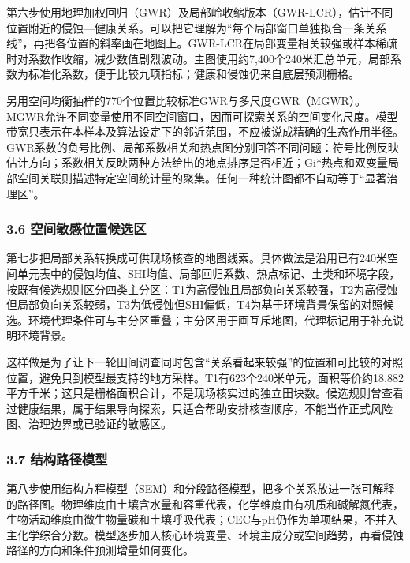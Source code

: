 \documentclass[
  10.5pt,
]{article}
\begin{document}
第六步使用地理加权回归（GWR）及局部岭收缩版本（GWR-LCR），估计不同位置附近的侵蚀---健康关系。可以把它理解为``每个局部窗口单独拟合一条关系线''，再把各位置的斜率画在地图上。GWR-LCR在局部变量相关较强或样本稀疏时对系数作收缩，减少数值剧烈波动。主图使用约7,400个240米汇总单元，局部系数为标准化系数，便于比较九项指标；健康和侵蚀仍来自底层预测栅格。

另用空间均衡抽样的770个位置比较标准GWR与多尺度GWR（MGWR）。MGWR允许不同变量使用不同空间窗口，因而可探索关系的空间变化尺度。模型带宽只表示在本样本及算法设定下的邻近范围，不应被说成精确的生态作用半径。GWR系数的负号比例、局部系数相关和热点图分别回答不同问题：符号比例反映估计方向；系数相关反映两种方法给出的地点排序是否相近；Gi*热点和双变量局部空间关联则描述特定空间统计量的聚集。任何一种统计图都不自动等于``显著治理区''。

\hypertarget{ux7a7aux95f4ux654fux611fux4f4dux7f6eux5019ux9009ux533a}{%
\subsubsection{3.6
空间敏感位置候选区}\label{ux7a7aux95f4ux654fux611fux4f4dux7f6eux5019ux9009ux533a}}

第七步把局部关系转换成可供现场核查的地图线索。具体做法是沿用已有240米空间单元表中的侵蚀均值、SHI均值、局部回归系数、热点标记、土类和环境字段，按既有候选规则区分四类主分区：T1为高侵蚀且局部负向关系较强，T2为高侵蚀但局部负向关系较弱，T3为低侵蚀但SHI偏低，T4为基于环境背景保留的对照候选。环境代理条件可与主分区重叠；主分区用于画互斥地图，代理标记用于补充说明环境背景。

这样做是为了让下一轮田间调查同时包含``关系看起来较强''的位置和可比较的对照位置，避免只到模型最支持的地方采样。T1有623个240米单元，面积等价约18.882平方千米；这只是栅格面积合计，不是现场核实过的独立田块数。候选规则曾查看过健康结果，属于结果导向探索，只适合帮助安排核查顺序，不能当作正式风险图、治理边界或已验证的敏感区。

\hypertarget{ux7ed3ux6784ux8defux5f84ux6a21ux578b}{%
\subsubsection{3.7
结构路径模型}\label{ux7ed3ux6784ux8defux5f84ux6a21ux578b}}

第八步使用结构方程模型（SEM）和分段路径模型，把多个关系放进一张可解释的路径图。物理维度由土壤含水量和容重代表，化学维度由有机质和碱解氮代表，生物活动维度由微生物量碳和土壤呼吸代表；CEC与pH仍作为单项结果，不并入主化学综合分数。模型逐步加入核心环境变量、环境主成分或空间趋势，再看侵蚀路径的方向和条件预测增量如何变化。
\end{document}
